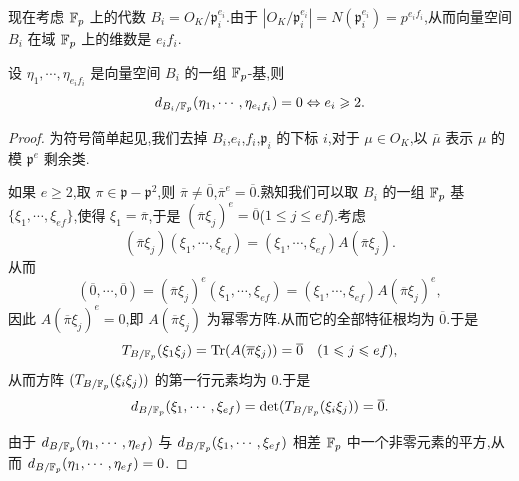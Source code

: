 现在考虑 $\mathbb{F}_p$ 上的代数 $B_i=O_K/\mathfrak{p}_i^{e_i}$.由于 $|O_K/\mathfrak{p}_i^{e_i}|=N(\mathfrak{p}_i^{e_i})=p^{e_if_i}$,从而向量空间 $B_i$ 在域 $\mathbb{F}_p$ 上的维数是 $e_if_i$.

\begin{lemma}\label{lem:ch2-13}
设 $\eta_1,\cdots,\eta_{e_if_i}$ 是向量空间 $B_i$ 的一组 $\mathbb{F}_p$-基,则
\[
  d_{B_i/\mathbb{F}_p}(\eta_1,\cdots,\eta_{e_if_i})=0\Leftrightarrow e_i\geqslant 2.
\]
\end{lemma}

\begin{proof}
为符号简单起见,我们去掉 $B_i$,$e_i$,$f_i$,$\mathfrak{p}_i$ 的下标 $i$,对于 $\mu\in O_K$,以 $\bar{\mu}$ 表示 $\mu$ 的模 $\mathfrak{p}^e$ 剩余类.

如果 $e\geqslant 2$,取 $\pi\in\mathfrak{p}-\mathfrak{p}^2$,则 $\overline{\pi}\neq\overline{0}$,$\overline{\pi}^e=\overline{0}$.熟知我们可以取 $B_i$ 的一组 $\mathbb{F}_p$ 基 $\{\xi_1,\cdots,\xi_{ef}\}$,使得 $\xi_1=\overline{\pi}$,于是 $(\overline{\pi}\xi_j)^e=\overline{0}$($1\leqslant j\leqslant ef$).考虑
\[
  (\bar{\pi}\xi_j)(\xi_1,\cdots,\xi_{ef})=(\xi_1,\cdots,\xi_{ef})A(\bar{\pi}\xi_j).
\]
从而
\[
  (\overline{0},\cdots,\overline{0})=(\overline{\pi}\xi_j)^e(\xi_1,\cdots,\xi_{ef})
  =(\xi_1,\cdots,\xi_{ef})A(\overline{\pi}\xi_j)^e,
\]
因此 $A(\overline{\pi}\xi_j)^e=0$,即 $A(\overline{\pi}\xi_j)$ 为幂零方阵.从而它的全部特征根均为 $\overline{0}$.于是
\[
  T_{B/\mathbb{F}_p}(\xi_1\xi_j)=\mathrm{Tr}(A(\overline{\pi}\xi_j))=\overline{0}\quad (1\leqslant j\leqslant ef),
\]
从而方阵 $(T_{B/\mathbb{F}_p}(\xi_i\xi_j))$ 的第一行元素均为 $0$.于是
\[
  d_{B/\mathbb{F}_p}(\xi_1,\cdots,\xi_{ef})=\det(T_{B/\mathbb{F}_p}(\xi_i\xi_j))=\overline{0}.
\]
\begin{sloppypar}
由于 $d_{B/\mathbb{F}_p}(\eta_1,\cdots,\eta_{ef})$ 与 $d_{B/\mathbb{F}_p}(\xi_1,\cdots,\xi_{ef})$ 相差 $\mathbb{F}_p$ 中一个非零元素的平方,从而 $d_{B/\mathbb{F}_p}(\eta_1,\cdots,\eta_{ef})=0$.
\end{sloppypar}


\end{proof}

